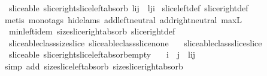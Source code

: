 \begin{isabellebody}
%
\isadelimproof
\isanewline
%
\endisadelimproof
\isanewline
{}\isamarkupfalse%
\ {\isacharparenleft}\ sliceable{\isacharparenright}\ slice{\isacharunderscore}right{\isacharunderscore}slice{\isacharunderscore}left{\isacharunderscore}absorb{\isacharcolon}\ {\isachardoublequoteopen}{\isacharparenleft}l{\isasymdagger}{\isachardot}{\isachardot}i{\isacharparenright}{\isasymdagger}j{\isachardot}{\isachardot}\ {\isacharequal}\ l{\isasymdagger}j{\isachardot}{\isachardot}i{\isachardoublequoteclose}\isanewline
%
\isadelimproof
%
\endisadelimproof
%
\isatagproof
{}\isamarkupfalse%
\ slice{\isacharunderscore}left{\isacharunderscore}def\ slice{\isacharunderscore}right{\isacharunderscore}def\isanewline
{}\isamarkupfalse%
\ {\isacharparenleft}metis\ {\isacharparenleft}mono{\isacharunderscore}tags{\isacharcomma}\ hide{\isacharunderscore}lams{\isacharparenright}\ add{\isachardot}left{\isacharunderscore}neutral\ add{\isachardot}right{\isacharunderscore}neutral\ max{\isacharunderscore}{}L\ \isanewline
\ \ min{\isachardot}left{\isacharunderscore}idem\ size{\isacharunderscore}slice{\isacharunderscore}right{\isacharunderscore}absorb\ slice{\isacharunderscore}right{\isacharunderscore}def\ \isanewline
\ \ sliceable{\isacharunderscore}class{\isachardot}size{\isacharunderscore}slice\ sliceable{\isacharunderscore}class{\isachardot}slice{\isacharunderscore}none\ \isanewline
\ \ sliceable{\isacharunderscore}class{\isachardot}slice{\isacharunderscore}slice{\isacharparenright}%
\endisatagproof
{\isafoldproof}%
%
\isadelimproof
\isanewline
%
\endisadelimproof
\isanewline
{}\isamarkupfalse%
\ {\isacharparenleft}\ sliceable{\isacharparenright}\ slice{\isacharunderscore}right{\isacharunderscore}slice{\isacharunderscore}left{\isacharunderscore}absorb{\isacharunderscore}empty{\isacharcolon}\ \isanewline
\ \ {\isachardoublequoteopen}i\ {\isasymle}\ j\ {\isasymLongrightarrow}\ {\isacharparenleft}{\isacharhash}{\isacharparenleft}{\isacharparenleft}l{\isasymdagger}{\isachardot}{\isachardot}i{\isacharparenright}{\isasymdagger}j{\isachardot}{\isachardot}{\isacharparenright}{\isacharparenright}\ {\isacharequal}\ {}{\isachardoublequoteclose}\isanewline
%
\isadelimproof
%
\endisadelimproof
%
\isatagproof
{}\isamarkupfalse%
\ {\isacharparenleft}simp\ add{\isacharcolon}\ size{\isacharunderscore}slice{\isacharunderscore}left{\isacharunderscore}absorb\ size{\isacharunderscore}slice{\isacharunderscore}right{\isacharunderscore}absorb{\isacharparenright}%
\endisatagproof

\end{isabellebody}

